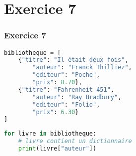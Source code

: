 \documentclass[svgnames,11pt]{beamer}
\begin{document}
\section{Exercice 7}
\begin{frame}[fragile]
    \frametitle{Exercice 7}

\begin{lstlisting}[language=Python , basicstyle=\ttfamily\small, xleftmargin=2em, xrightmargin=2em]
bibliotheque = [
    {"titre": "Il était deux fois",
        "auteur": "Franck Thilliez",
        "editeur": "Poche",
        "prix": 8.70},
    {"titre": "Fahrenheit 451",
        "auteur": "Ray Bradbury",
        "editeur": "Folio",
        "prix": 6.30}
]
\end{lstlisting}

\begin{center}
    \begin{lstlisting}[language=Python , basicstyle=\ttfamily\small, xleftmargin=2em, xrightmargin=2em]
for livre in bibliotheque:
    # livre contient un dictionnaire
    print(livre["auteur"])
\end{lstlisting}
    \label{CODE}
    \end{center}
\end{frame}
\end{document}
